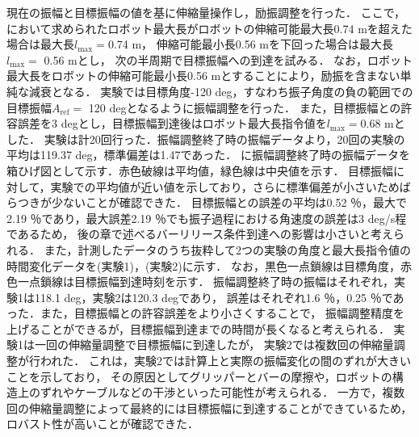         現在の振幅と目標振幅の値を基に伸縮量操作し，励振調整を行った．
        ここで，において求められたロボット最大長がロボットの伸縮可能最大長0.74 mを超えた場合は最大長$l_{\mathrm{max}} =$0.74 m，
        伸縮可能最小長0.56 mを下回った場合は最大長$l_{\mathrm{max}} =$ 0.56 mとし，
        次の半周期で目標振幅への到達を試みる．
        なお，ロボット最大長をロボットの伸縮可能最小長0.56 mとすることにより，励振を含まない単純な減衰となる．
        実験では目標角度-120 deg，すなわち振子角度の負の範囲での目標振幅$A_{\mathrm{ref}} =$ 120 degとなるように振幅調整を行った．
        また，目標振幅との許容誤差を3 degとし，目標振幅到達後はロボット最大長指令値を$l_{\mathrm{max}} =$0.68 mとした．
        実験は計20回行った．振幅調整終了時の振幅データより，20回の実験の平均は119.37 deg，標準偏差は1.47であった．
        に振幅調整終了時の振幅データを箱ひげ図として示す．赤色破線は平均値，緑色線は中央値を示す．
        目標振幅に対して，実験での平均値が近い値を示しており，さらに標準偏差が小さいためばらつきが少ないことが確認できた．
        目標振幅との誤差の平均は0.52 ％，最大で2.19 ％であり，最大誤差2.19 ％でも振子過程における角速度の誤差は3 deg/s程であるため，
        後の章で述べるバーリリース条件到達への影響は小さいと考えられる．
        また，計測したデータのうち抜粋して2つの実験の角度と最大長指令値の時間変化データを(実験1)，(実験2)に示す．
        なお，黒色一点鎖線は目標角度，赤色一点鎖線は目標振幅到達時刻を示す．
        振幅調整終了時の振幅はそれぞれ，実験1は118.1 deg，実験2は120.3 degであり，
        誤差はそれぞれ1.6 ％，0.25 ％であった．また，目標振幅との許容誤差をより小さくすることで，
        振幅調整精度を上げることができるが，目標振幅到達までの時間が長くなると考えられる．
        実験1は一回の伸縮量調整で目標振幅に到達したが，
        実験2では複数回の伸縮量調整が行われた．
        これは，実験2では計算上と実際の振幅変化の間のずれが大きいことを示しており，
        その原因としてグリッパーとバーの摩擦や，ロボットの構造上のずれやケーブルなどの干渉といった可能性が考えられる．
        一方で，複数回の伸縮量調整によって最終的には目標振幅に到達することができているため，
        ロバスト性が高いことが確認できた．
        





          


